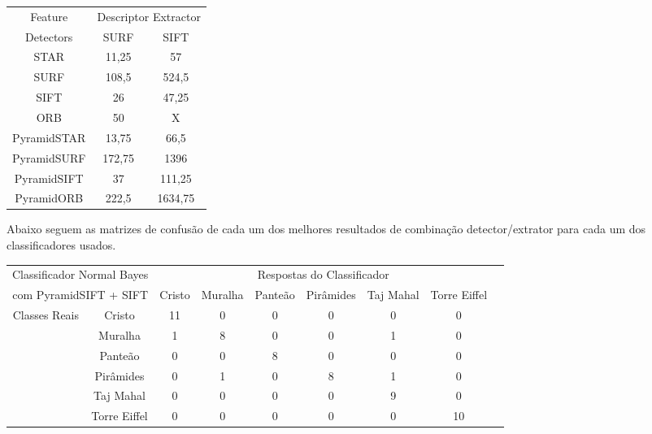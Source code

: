 \documentclass[a4paper,11pt]{article}
\begin{document}
  \vspace{15pt}
  \hspace{65pt}
  \begin{tabular}{|c|c|c|}
    \hline
    Feature &  \multicolumn{2}{|c|}{Descriptor Extractor} \\
    \cline{2-3}
     Detectors & SURF & SIFT \\
    \hline
    STAR & 11,25 & 57 \\
    SURF & 108,5 & 524,5 \\
    SIFT  & 26 & 47,25 \\
    ORB  & 50 & X \\
    PyramidSTAR & 13,75 & 66,5 \\
    PyramidSURF & 172,75 & 1396 \\
    PyramidSIFT & 37 & 111,25 \\
    PyramidORB & 222,5 & 1634,75 \\
    \hline
  \end{tabular}
  \vspace{15pt}

  Abaixo seguem as matrizes de confusão de cada um dos melhores resultados de
  combinação detector/extrator para cada um dos classificadores usados.

  \vspace{15pt}
  \hspace{-75pt}
  \begin{tabular}{|cc|c|c|c|c|c|c|c|}
    \hline
    \multicolumn{2}{|c|}{Classificador Normal Bayes} &
    \multicolumn{6}{|c|}{Respostas do Classificador} \\
    \cline{3-8}
    \multicolumn{2}{|c|}{com PyramidSIFT + SIFT}
    & Cristo & Muralha & Panteão & Pirâmides & Taj Mahal & Torre Eiffel \\
    \hline
    \multirow{6}{*}{Classes Reais}
    & \multicolumn{1}{|c|}{Cristo} & 11 & 0 & 0 & 0 & 0 & 0 \\
    \cline{2-8}
    & \multicolumn{1}{|c|}{Muralha} & 1 & 8 & 0 & 0 & 1 & 0\\
    \cline{2-8}
    & \multicolumn{1}{|c|}{Panteão} & 0 & 0 & 8 & 0 & 0 & 0\\
    \cline{2-8}
    & \multicolumn{1}{|c|}{Pirâmides} & 0 & 1 & 0 & 8 & 1 & 0\\
    \cline{2-8}
    & \multicolumn{1}{|c|}{Taj Mahal} & 0 & 0 & 0 & 0 & 9 & 0\\
    \cline{2-8}
    & \multicolumn{1}{|c|}{Torre Eiffel} & 0 & 0 & 0 & 0 & 0 & 10\\
    \hline
  \end{tabular}
  \bigskip
  
\end{document}
